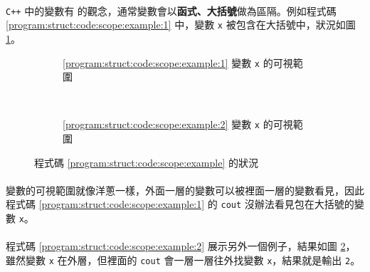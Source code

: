 \documentclass[12pt,a4paper,oneside]{article}
\begin{document}
\begin{CJK}{UTF8}{bkai}
\paragraph{}\texttt{C++} 中的變數有 的觀念，通常變數會以{\color{blue}\textbf{函式、大括號}}做為區隔。例如程式碼 \ref{program:struct:code:scope:example:1} 中，變數 \lstinline!x! 被包含在大括號中，狀況如圖 \ref{program:struct:fig:scope:example:1}。

\begin{figure}[h!]
\centering
\begin{subfigure}{.35\textwidth}
  \centering
  \caption{\ref{program:struct:code:scope:example:1} 變數 \lstinline!x! 的可視範圍}
  \label{program:struct:fig:scope:example:1}
\end{subfigure}
~
\begin{subfigure}{.35\textwidth}
  \centering
  \caption{\ref{program:struct:code:scope:example:2} 變數 \lstinline!x! 的可視範圍}
  \label{program:struct:fig:scope:example:2}
\end{subfigure}
\caption{程式碼 \ref{program:struct:code:scope:example} 的狀況}
\label{program:struct:fig:scope:example}
\end{figure}

\paragraph{}變數的可視範圍就像洋蔥一樣，外面一層的變數可以被裡面一層的變數看見，因此程式碼 \ref{program:struct:code:scope:example:1} 的 \lstinline!cout! 沒辦法看見包在大括號的變數 \lstinline!x!。

\paragraph{}程式碼 \ref{program:struct:code:scope:example:2} 展示另外一個例子，結果如圖 \ref{program:struct:fig:scope:example:2}，雖然變數 \lstinline!x! 在外層，但裡面的 \lstinline!cout! 會一層一層往外找變數 \lstinline!x!，結果就是輸出 \lstinline!2!。


\end{CJK}
\end{document}
